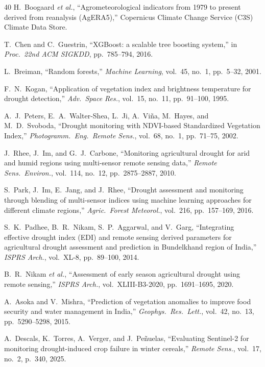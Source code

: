 \documentclass[11pt,a4paper,oneside]{article}
\begin{document}
\begin{thebibliography}{40}
 H.~Boogaard \textit{et al.}, ``Agrometeorological indicators from 1979 to present derived from reanalysis (AgERA5),'' Copernicus Climate Change Service (C3S) Climate Data Store.

 T.~Chen and C.~Guestrin, ``XGBoost: a scalable tree boosting system,'' in \textit{Proc.\ 22nd ACM SIGKDD}, pp.~785--794, 2016.

 L.~Breiman, ``Random forests,'' \textit{Machine Learning}, vol.~45, no.~1, pp.~5--32, 2001.

 F.~N.~Kogan, ``Application of vegetation index and brightness temperature for drought detection,'' \textit{Adv.\ Space Res.}, vol.~15, no.~11, pp.~91--100, 1995.

 A.~J.~Peters, E.~A.~Walter-Shea, L.~Ji, A.~Vi\~{n}a, M.~Hayes, and M.~D.~Svoboda, ``Drought monitoring with NDVI-based Standardized Vegetation Index,'' \textit{Photogramm.\ Eng.\ Remote Sens.}, vol.~68, no.~1, pp.~71--75, 2002.

 J.~Rhee, J.~Im, and G.~J.~Carbone, ``Monitoring agricultural drought for arid and humid regions using multi-sensor remote sensing data,'' \textit{Remote Sens.\ Environ.}, vol.~114, no.~12, pp.~2875--2887, 2010.

 S.~Park, J.~Im, E.~Jang, and J.~Rhee, ``Drought assessment and monitoring through blending of multi-sensor indices using machine learning approaches for different climate regions,'' \textit{Agric.\ Forest Meteorol.}, vol.~216, pp.~157--169, 2016.

 S.~K.~Padhee, B.~R.~Nikam, S.~P.~Aggarwal, and V.~Garg, ``Integrating effective drought index (EDI) and remote sensing derived parameters for agricultural drought assessment and prediction in Bundelkhand region of India,'' \textit{ISPRS Arch.}, vol.~XL-8, pp.~89--100, 2014.

 B.~R.~Nikam \textit{et al.}, ``Assessment of early season agricultural drought using remote sensing,'' \textit{ISPRS Arch.}, vol.~XLIII-B3-2020, pp.~1691--1695, 2020.

 A.~Asoka and V.~Mishra, ``Prediction of vegetation anomalies to improve food security and water management in India,'' \textit{Geophys.\ Res.\ Lett.}, vol.~42, no.~13, pp.~5290--5298, 2015.

 A.~Descals, K.~Torres, A.~Verger, and J.~Pe\~{n}uelas, ``Evaluating Sentinel-2 for monitoring drought-induced crop failure in winter cereals,'' \textit{Remote Sens.}, vol.~17, no.~2, p.~340, 2025.


\end{thebibliography}
\end{document}
